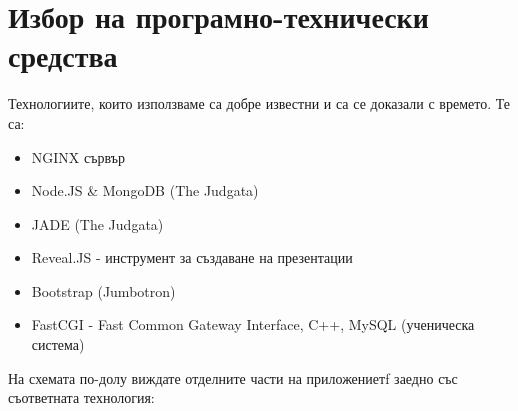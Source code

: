 \documentclass[28pt]{article}
\begin{document}
	\section{Избор на програмно-технически средства}
	Технологиите, които използваме са добре известни и са се доказали с времето. Те са:
	\begin{itemize}
		\item \foreignlanguage{english}{NGINX} сървър
		\item \foreignlanguage{english}{Node.JS \& MongoDB} (\foreignlanguage{english}{The Judgata})
		\item \foreignlanguage{english}{JADE} (\foreignlanguage{english}{The Judgata})
		\item \foreignlanguage{english}{Reveal.JS} - инструмент за създаване на презентации
		\item \foreignlanguage{english}{Bootstrap (Jumbotron)}
		\item \foreignlanguage{english}{FastCGI - Fast Common Gateway Interface, C++, MySQL} (ученическа система)
	\end{itemize}
	\vspace{1cm}
	На \foreignlanguage{bulgarian}{с}хемата по-долу виждате отделните  части на приложениетf заедно със съответната технология:\\
	\vspace{0.5cm} \\
\end{document}
